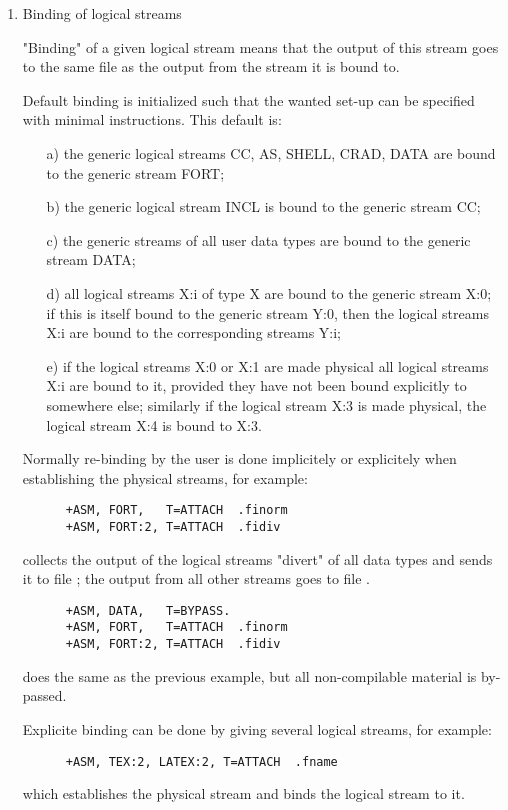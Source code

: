 \begin{enumerate}
\item
Binding of logical streams

"Binding" of a given logical stream means that the output of this stream
goes to the same file as the output from the stream it is bound to.

Default binding is initialized such that the wanted set-up can be
specified with minimal instructions. This default is:
\begin{itemize}
\item[a)] the generic logical streams CC, AS, SHELL, CRAD, DATA are bound
      to the generic stream FORT;

\item[b)] the generic logical stream INCL is bound to the generic stream CC;

\item[c)] the generic streams of all user data types are bound to
      the generic stream DATA;

\item[d)] all logical streams X:i of type X are bound to the generic stream X:0;
      if this is itself bound to the generic stream Y:0, then the logical
      streams X:i are bound to the corresponding streams Y:i;

\item[e)] if the logical streams X:0 or X:1 are made physical all logical
      streams X:i are bound to it, provided they have not been bound
      explicitly to somewhere else; similarly if the logical stream X:3
      is made physical, the logical stream X:4 is bound to X:3.
\end{itemize}
Normally re-binding by the user is done implicitely or explicitely when
establishing the physical streams, for example:
\begin{verbatim}
      +ASM, FORT,   T=ATTACH  .finorm
      +ASM, FORT:2, T=ATTACH  .fidiv
\end{verbatim}
collects the output of the logical streams "divert" of all data types
and sends it to file ; the output from all other streams goes
to file .
\begin{verbatim}
      +ASM, DATA,   T=BYPASS.
      +ASM, FORT,   T=ATTACH  .finorm
      +ASM, FORT:2, T=ATTACH  .fidiv
\end{verbatim}
does the same as the previous example, but all non-compilable material
is by-passed.

Explicite binding can be done by giving several logical streams,
for example:
\begin{verbatim}
      +ASM, TEX:2, LATEX:2, T=ATTACH  .fname
\end{verbatim}
which establishes the physical stream  and binds the logical
stream  to it.


\end{enumerate}
